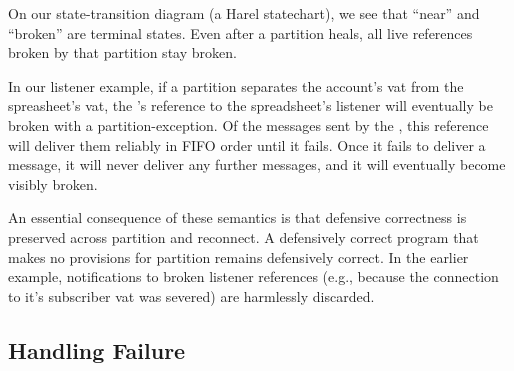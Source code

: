 \documentclass{llncs}
\begin{document}
On our state-transition diagram (a Harel statechart), we see that
``near'' and ``broken'' are terminal states. Even after a partition
heals, all live references broken by that partition stay broken.

In our listener example, if a partition separates the account's vat
from the spreasheet's vat, the 's reference to the
spreadsheet's listener will eventually be broken with a
partition-exception. Of the  messages sent by the
, this reference will deliver them reliably in FIFO
order until it fails. Once it fails to deliver a message, it will
never deliver any further messages, and it will eventually become
visibly broken.

An essential consequence of these semantics is that defensive
correctness is preserved across partition and reconnect.  A
defensively correct program that makes no provisions for partition
remains defensively correct. In the earlier 
example,  notifications to broken listener
references (e.g., because the connection to it's subscriber vat was
severed) are harmlessly discarded.

\subsection{Handling Failure}
\end{document}
